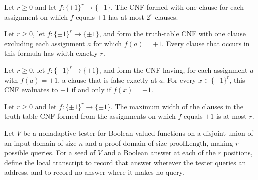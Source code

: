 \begin{theorem}
\label{FABL.truthTableCNF_size_le}
\leanok
{}
Let $r\ge 0$ and let $f:\{\pm1\}^r\to\{\pm1\}$. The CNF formed with one clause for each
assignment on which $f$ equals $+1$ has at most $2^r$ clauses.
\end{theorem}

\begin{theorem}
\label{FABL.truthTableCNF_clause_width}
\leanok
{}
Let $r\ge 0$, let $f:\{\pm1\}^r\to\{\pm1\}$, and form the truth-table CNF with one
clause excluding each assignment $a$ for which $f(a)=+1$. Every clause that occurs in
this formula has width exactly $r$.
\end{theorem}

\begin{theorem}
\label{FABL.truthTableCNF_eval_eq_neg_one_iff}
\leanok
{}
Let $r\ge 0$, let $f:\{\pm1\}^r\to\{\pm1\}$, and form the CNF having, for each
assignment $a$ with $f(a)=+1$, a clause that is false exactly at $a$. For every
$x\in\{\pm1\}^r$, this CNF evaluates to $-1$ if and only if $f(x)=-1$.
\end{theorem}

\begin{theorem}
\label{FABL.truthTableCNF_width_le}
\leanok
{}
Let $r\ge 0$ and let $f:\{\pm1\}^r\to\{\pm1\}$. The maximum width of the clauses in the
truth-table CNF formed from the assignments on which $f$ equals $+1$ is at most $r$.
\end{theorem}

\begin{definition}
\label{FABL.localTranscript}
\leanok
{}
Let $V$ be a nonadaptive tester for Boolean-valued functions on a disjoint union of an
input domain of size $n$ and a proof domain of size $\text{proofLength}$, making $r$
possible queries. For a seed of $V$ and a Boolean answer at each of the $r$ positions,
define the local transcript to record that answer wherever the tester queries an
address, and to record no answer where it makes no query.
\end{definition}

